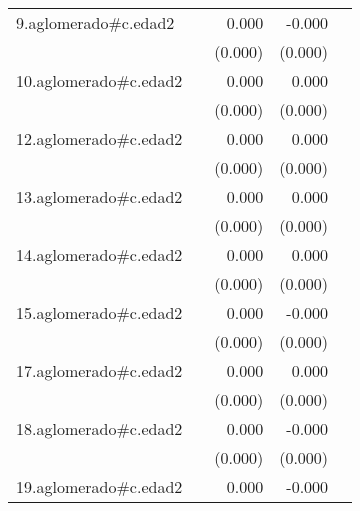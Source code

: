 {\begin{longtable}{l*{4}{D{.}{.}{-1}}}
\addlinespace
9.aglomerado#c.edad2&                     &       0.000         &      -0.000         &                     \\
            &                     &     (0.000)         &     (0.000)         &                     \\
\addlinespace
10.aglomerado#c.edad2&                     &       0.000\sym{*}  &       0.000         &                     \\
            &                     &     (0.000)         &     (0.000)         &                     \\
\addlinespace
12.aglomerado#c.edad2&                     &       0.000\sym{**} &       0.000         &                     \\
            &                     &     (0.000)         &     (0.000)         &                     \\
\addlinespace
13.aglomerado#c.edad2&                     &       0.000\sym{**} &       0.000         &                     \\
            &                     &     (0.000)         &     (0.000)         &                     \\
\addlinespace
14.aglomerado#c.edad2&                     &       0.000         &       0.000         &                     \\
            &                     &     (0.000)         &     (0.000)         &                     \\
\addlinespace
15.aglomerado#c.edad2&                     &       0.000         &      -0.000         &                     \\
            &                     &     (0.000)         &     (0.000)         &                     \\
\addlinespace
17.aglomerado#c.edad2&                     &       0.000         &       0.000         &                     \\
            &                     &     (0.000)         &     (0.000)         &                     \\
\addlinespace
18.aglomerado#c.edad2&                     &       0.000         &      -0.000         &                     \\
            &                     &     (0.000)         &     (0.000)         &                     \\
\addlinespace
19.aglomerado#c.edad2&                     &       0.000         &      -0.000         &                     \\

\end{longtable}}
